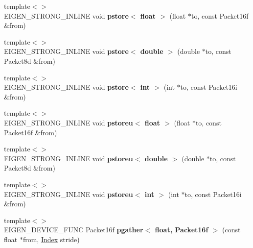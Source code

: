 \begin{DoxyCompactItemize}
{\footnotesize template$<$$>$ }\\E\+I\+G\+E\+N\+\_\+\+S\+T\+R\+O\+N\+G\+\_\+\+I\+N\+L\+I\+NE void {\bfseries pstore$<$ float $>$} (float $\ast$to, const Packet16f \&from)
\item 
\mbox{\label{namespace_eigen_1_1internal_a13403676a392cc9fd9e0ce0f859c1e1a}} 
{\footnotesize template$<$$>$ }\\E\+I\+G\+E\+N\+\_\+\+S\+T\+R\+O\+N\+G\+\_\+\+I\+N\+L\+I\+NE void {\bfseries pstore$<$ double $>$} (double $\ast$to, const Packet8d \&from)
\item 
\mbox{\label{namespace_eigen_1_1internal_a64f6fc0dab8b3007b63007f2fc675d43}} 
{\footnotesize template$<$$>$ }\\E\+I\+G\+E\+N\+\_\+\+S\+T\+R\+O\+N\+G\+\_\+\+I\+N\+L\+I\+NE void {\bfseries pstore$<$ int $>$} (int $\ast$to, const Packet16i \&from)
\item 
\mbox{\label{namespace_eigen_1_1internal_a21f13e153c7b067d3f51a5c42dd4c4ae}} 
{\footnotesize template$<$$>$ }\\E\+I\+G\+E\+N\+\_\+\+S\+T\+R\+O\+N\+G\+\_\+\+I\+N\+L\+I\+NE void {\bfseries pstoreu$<$ float $>$} (float $\ast$to, const Packet16f \&from)
\item 
\mbox{\label{namespace_eigen_1_1internal_acf2cf73c5b686b7520a76735d0a69433}} 
{\footnotesize template$<$$>$ }\\E\+I\+G\+E\+N\+\_\+\+S\+T\+R\+O\+N\+G\+\_\+\+I\+N\+L\+I\+NE void {\bfseries pstoreu$<$ double $>$} (double $\ast$to, const Packet8d \&from)
\item 
\mbox{\label{namespace_eigen_1_1internal_aee94c02a7af9ac096f6162d156663d7e}} 
{\footnotesize template$<$$>$ }\\E\+I\+G\+E\+N\+\_\+\+S\+T\+R\+O\+N\+G\+\_\+\+I\+N\+L\+I\+NE void {\bfseries pstoreu$<$ int $>$} (int $\ast$to, const Packet16i \&from)
\item 
\mbox{\label{namespace_eigen_1_1internal_ac431adc8d4eb3054f3b4a15b3b391e8f}} 
{\footnotesize template$<$$>$ }\\E\+I\+G\+E\+N\+\_\+\+D\+E\+V\+I\+C\+E\+\_\+\+F\+U\+NC Packet16f {\bfseries pgather$<$ float, Packet16f $>$} (const float $\ast$from, \hyperlink{namespace_eigen_a62e77e0933482dafde8fe197d9a2cfde}{Index} stride)

\end{DoxyCompactItemize}
